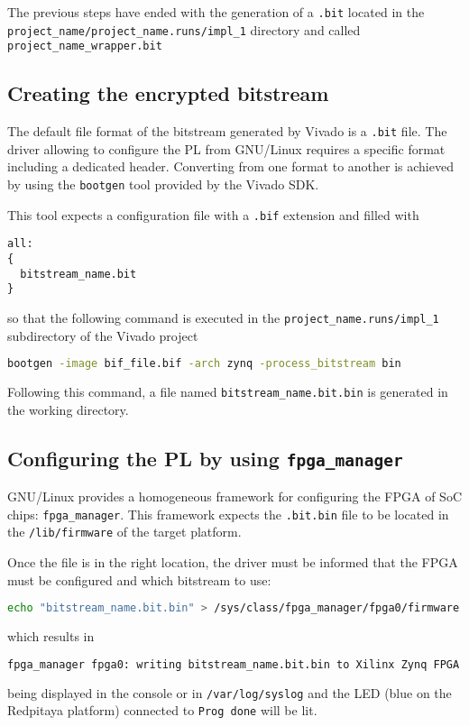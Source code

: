 \documentclass[10pt,oneside]{article}
\begin{document}
The previous steps have ended with the generation of a {\tt .bit} located in
the \\{\tt project\_name/project\_name.runs/impl\_1} directory and called 
{\tt project\_name\_wrapper.bit}

\subsection{Creating the encrypted bitstream}

The default file format of the bitstream generated by Vivado is a {\tt .bit} file.
The driver allowing to configure the PL from GNU/Linux requires a specific format
including a dedicated header. Converting from one format to another is achieved by
using the {\tt bootgen} tool provided by the Vivado SDK.

This tool expects a configuration file with a {\tt .bif} extension and filled with
\begin{lstlisting}
all:
{
  bitstream_name.bit
}
\end{lstlisting}

so that the following command is executed in the {\tt project\_name.runs/impl\_1} subdirectory
of the Vivado project
\begin{lstlisting}[language=bash]
bootgen -image bif_file.bif -arch zynq -process_bitstream bin
\end{lstlisting}

Following this command, a file named {\tt bitstream\_name.bit.bin} is generated in
the working directory.

\subsection{Configuring the PL by using {\tt fpga\_manager}}

GNU/Linux provides a homogeneous framework for configuring the FPGA of SoC chips: {\tt fpga\_manager}.
This framework expects the {\tt .bit.bin} file to be located in the {\tt /lib/firmware} of the
target platform.

Once the file is in the right location, the driver must be informed that the
FPGA must be configured and which bitstream to use:
\begin{lstlisting}[language=bash]
echo "bitstream_name.bit.bin" > /sys/class/fpga_manager/fpga0/firmware
\end{lstlisting}
which results in
\begin{lstlisting}[language=bash]
fpga_manager fpga0: writing bitstream_name.bit.bin to Xilinx Zynq FPGA Manager
\end{lstlisting}
being displayed in the console or in {\tt /var/log/syslog} and the LED (blue on the
Redpitaya platform) connected to {\tt Prog done} will be lit.
\end{document}
